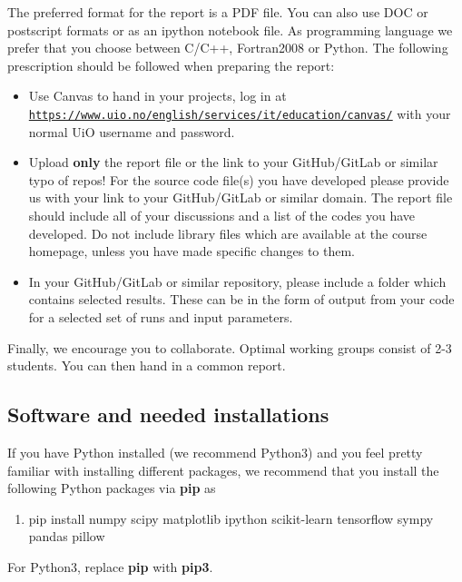 \documentclass[%
oneside,                 %
final,                   %
10pt]{article}
\begin{document}
The preferred format for the report is a PDF file. You can also use DOC or postscript formats or as an ipython notebook file.  As programming language we prefer that you choose between C/C++, Fortran2008 or Python. The following prescription should be followed when preparing the report:

\begin{itemize}
  \item Use Canvas to hand in your projects, log in  at  \href{{https://www.uio.no/english/services/it/education/canvas/}}{\nolinkurl{https://www.uio.no/english/services/it/education/canvas/}} with your normal UiO username and password.

  \item Upload \textbf{only} the report file or the link to your GitHub/GitLab or similar typo of  repos!  For the source code file(s) you have developed please provide us with your link to your GitHub/GitLab or similar  domain.  The report file should include all of your discussions and a list of the codes you have developed.  Do not include library files which are available at the course homepage, unless you have made specific changes to them.

  \item In your GitHub/GitLab or similar repository, please include a folder which contains selected results. These can be in the form of output from your code for a selected set of runs and input parameters.
\end{itemize}

\noindent
Finally, 
we encourage you to collaborate. Optimal working groups consist of 
2-3 students. You can then hand in a common report. 

\subsection*{Software and needed installations}

If you have Python installed (we recommend Python3) and you feel pretty familiar with installing different packages, 
we recommend that you install the following Python packages via \textbf{pip} as
\begin{enumerate}
\item pip install numpy scipy matplotlib ipython scikit-learn tensorflow sympy pandas pillow
\end{enumerate}

\noindent
For Python3, replace \textbf{pip} with \textbf{pip3}.
\end{document}

